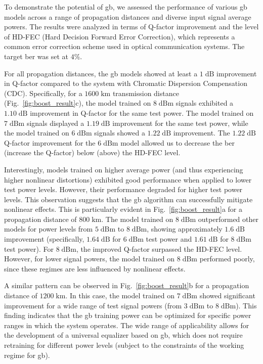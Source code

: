 To demonstrate the potential of \acrshort{gb}, we assessed the performance of various \acrshort{gb} models across a range of propagation distances and diverse input signal average powers. The results were analyzed in terms of Q-factor improvement and the level of HD-FEC (Hard Decision Forward Error Correction), which represents a common error correction scheme used in optical communication systems. The target \acrlong{ber} was set at $4\%$.

For all propagation distances, the \acrshort{gb} models showed at least a $1\;\textrm{dB}$ improvement in Q-factor compared to the system with Chromatic Dispersion Compensation (CDC). Specifically, for a $1600\;\textrm{km}$ transmission distance (Fig.~\ref{fig:boost_result}c), the model trained on $8\;\textrm{dBm}$ signals exhibited a $1.10\;\textrm{dB}$ improvement in Q-factor for the same test power. The model trained on $7\;\textrm{dBm}$ signals displayed a $1.19\;\textrm{dB}$ improvement for the same test power, while the model trained on $6\;\textrm{dBm}$ signals showed a $1.22\;\textrm{dB}$ improvement. The $1.22\;\textrm{dB}$ Q-factor improvement for the $6\;\textrm{dBm}$ model allowed us to decrease the \acrshort{ber} (increase the Q-factor) below (above) the HD-FEC level.

Interestingly, models trained on higher average power (and thus experiencing higher nonlinear distortions) exhibited good performance when applied to lower test power levels. However, their performance degraded for higher test power levels. This observation suggests that the \acrshort{gb} algorithm can successfully mitigate nonlinear effects. This is particularly evident in Fig.~\ref{fig:boost_result}a for a propagation distance of $800\;\textrm{km}$. The model trained on $8\;\textrm{dBm}$ outperformed other models for power levels from $5\;\textrm{dBm}$ to $8\;\textrm{dBm}$, showing approximately $1.6\;\textrm{dB}$ improvement (specifically, $1.64\;\textrm{dB}$ for $6\;\textrm{dBm}$ test power and $1.61\;\textrm{dB}$ for $8\;\textrm{dBm}$ test power). For $8\;\textrm{dBm}$, the improved Q-factor surpassed the HD-FEC level. However, for lower signal powers, the model trained on $8\;\textrm{dBm}$ performed poorly, since these regimes are less influenced by nonlinear effects.

A similar pattern can be observed in Fig.~\ref{fig:boost_result}b for a propagation distance of $1200\;\textrm{km}$. In this case, the model trained on $7\;\textrm{dBm}$ showed significant improvement for a wide range of test signal powers (from $3\;\textrm{dBm}$ to $8\;\textrm{dBm}$). This finding indicates that the \acrshort{gb} training power can be optimized for specific power ranges in which the system operates. The wide range of applicability allows for the development of a universal equalizer based on \acrshort{gb}, which does not require retraining for different power levels (subject to the constraints of the working regime for \acrshort{gb}).


